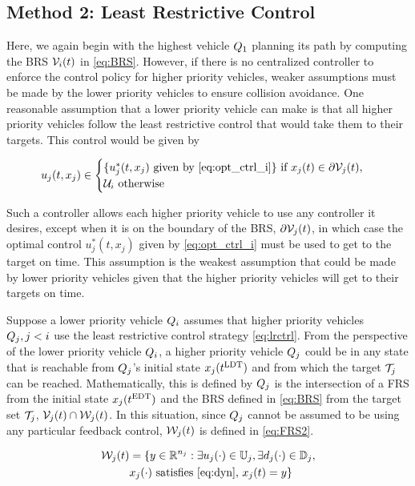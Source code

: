 \subsection{Method 2: Least Restrictive Control \label{sec:lrc}}
Here, we again begin with the highest vehicle $Q_1$ planning its path by computing the BRS $\mathcal{V}_i(t)$ in \eqref{eq:BRS}. However, if there is no centralized controller to enforce the control policy for higher priority vehicles, weaker assumptions must be made by the lower priority vehicles to ensure collision avoidance. One reasonable assumption that a lower priority vehicle can make is that all higher priority vehicles follow the least restrictive control that would take them to their targets. This control would be given by 

\begin{equation}
\label{eq:lrctrl} %
u_j(t, x_j)\in \begin{cases} \{u_j^*(t, x_j) \text{ given by } \eqref{eq:opt_ctrl_i}\} \text{ if } x_j(t)\in \partial \brs_j(t), \\
\cset_i  \text{ otherwise}
\end{cases}
\end{equation}

Such a controller allows each higher priority vehicle to use any controller it desires, except when it is on the boundary of the BRS, $\partial \mathcal{V}_j(t)$, in which case the optimal control $u_j^*(t, x_j)$ given by \eqref{eq:opt_ctrl_i} must be used to get to the target on time. This assumption is the weakest assumption that could be made by lower priority vehicles given that the higher priority vehicles will get to their targets on time.

Suppose a lower priority vehicle $Q_i$ assumes that higher priority vehicles $Q_j, j < i$ use the least restrictive control strategy \eqref{eq:lrctrl}. From the perspective of the lower priority vehicle $Q_i$, a higher priority vehicle $Q_j$ could be in any state that is reachable from $Q_j$'s initial state $x_j(t^\text{LDT})$ and from which the target $\mathcal{T}_j$ can be reached. Mathematically, this is defined by $Q_j$ is the intersection of a FRS from the initial state $x_j(t^\text{EDT})$ and the BRS defined in \eqref{eq:BRS} from the target set $\mathcal{T}_j$, $\mathcal{V}_j(t) \cap \mathcal{W}_j(t)$. In this situation, since $Q_j$ cannot be assumed to be using any particular feedback control, $\mathcal{W}_j(t)$ is defined in \eqref{eq:FRS2}.

\begin{equation}
\label{eq:FRS2}
\begin{aligned}
\mathcal{W}_j(t) &= \{y \in \mathbb{R}^{n_j}: \exists u_j(\cdot)\in\mathbb{U}_j, \exists d_j(\cdot) \in \mathbb{D}_j, \\
&x_j(\cdot) \text{ satisfies \eqref{eq:dyn}, }x_j(t) = y\}
\end{aligned}
\end{equation}

